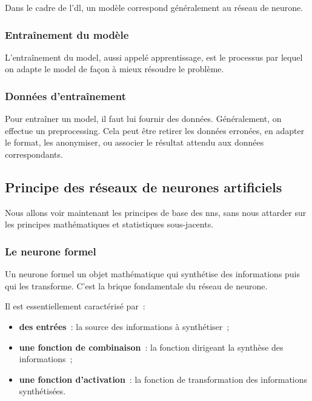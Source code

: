 Dans le cadre de l'\gls{dl}, un modèle correspond généralement au réseau de neurone.

\subsubsection{Entraînement du modèle}
L'entraînement du \gls{model}, aussi appelé apprentissage, est le processus par lequel on adapte le \gls{model} de façon à mieux résoudre le problème.

\subsubsection{Données d'entraînement}\label{def:preprocessing}
Pour entraîner un \gls{model}, il faut lui fournir des données.
Généralement, on effectue un \gls{preprocessing}. Cela peut être retirer les données erronées, en adapter le format, les anonymiser, ou associer le résultat attendu aux données correspondants.

\subsection{}
\subsection{Principe des réseaux de neurones artificiels}
\autocite{statsoft-nn}
Nous allons voir maintenant les principes de base des \glspl{nn}, sans nous attarder sur les principes mathématiques et statistiques sous-jacents.

\subsubsection{Le neurone formel}
Un neurone formel un objet mathématique qui synthétise des informations puis qui les transforme\autocite{datamining-nn}. C'est la brique fondamentale du réseau de neurone.

Il est essentiellement caractérisé par~:
\begin{itemize}
	\item \textbf{des entrées}~: la source des informations à synthétiser~;
	\item \textbf{une fonction de combinaison}~: la fonction dirigeant la synthèse des informations~;
	\item \textbf{une fonction d'activation}~: la fonction de transformation des informations synthétisées.
\end{itemize}

